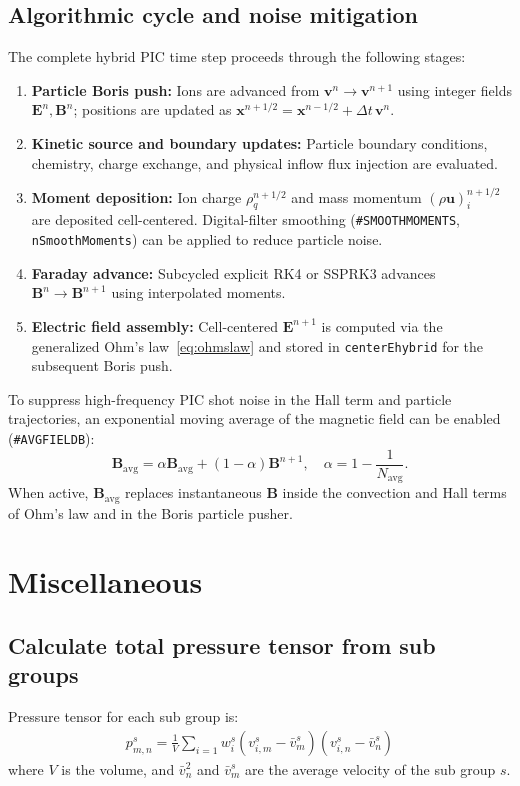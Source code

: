\documentclass[a4paper, 11pt]{article}
\begin{document}
\subsection{Algorithmic cycle and noise mitigation}

The complete hybrid PIC time step proceeds through the following stages:
\begin{enumerate}
  \item \textbf{Particle Boris push:} Ions are advanced from $\mathbf{v}^n \to \mathbf{v}^{n+1}$ using integer fields $\mathbf{E}^n, \mathbf{B}^n$; positions are updated as $\mathbf{x}^{n+1/2} = \mathbf{x}^{n-1/2} + \Delta t\,\mathbf{v}^n$.
  \item \textbf{Kinetic source and boundary updates:} Particle boundary conditions, chemistry, charge exchange, and physical inflow flux injection are evaluated.
  \item \textbf{Moment deposition:} Ion charge $\rho_q^{n+1/2}$ and mass momentum $(\rho\mathbf{u})_i^{n+1/2}$ are deposited cell-centered. Digital-filter smoothing (\texttt{\#SMOOTHMOMENTS}, \texttt{nSmoothMoments}) can be applied to reduce particle noise.
  \item \textbf{Faraday advance:} Subcycled explicit RK4 or SSPRK3 advances $\mathbf{B}^n \to \mathbf{B}^{n+1}$ using interpolated moments.
  \item \textbf{Electric field assembly:} Cell-centered $\mathbf{E}^{n+1}$ is computed via the generalized Ohm's law~\eqref{eq:ohmslaw} and stored in \texttt{centerEhybrid} for the subsequent Boris push.
\end{enumerate}

To suppress high-frequency PIC shot noise in the Hall term and particle trajectories, an exponential moving average of the magnetic field can be enabled (\texttt{\#AVGFIELDB}):
\begin{equation}
\mathbf{B}_{\text{avg}} = \alpha \mathbf{B}_{\text{avg}} + (1-\alpha)\mathbf{B}^{n+1}, \quad \alpha = 1 - \frac{1}{N_{\text{avg}}}.
\end{equation}
When active, $\mathbf{B}_{\text{avg}}$ replaces instantaneous $\mathbf{B}$ inside the convection and Hall terms of Ohm's law and in the Boris particle pusher.

\section{Miscellaneous}
\subsection{Calculate total pressure tensor from sub groups}
Pressure tensor for each sub group is:
\begin{eqnarray}
    p^s_{m,n} = \frac{1}{V} \sum_{i=1} w_i^s (v_{i,m}^s-\bar{v}_m^s) (v_{i,n}^s-\bar{v}_n^s) 
\end{eqnarray}
where $V$ is the volume, and $\bar{v}_n^2$ and $\bar{v}_m^s$ are the average velocity of the sub group $s$. 
\end{document}
